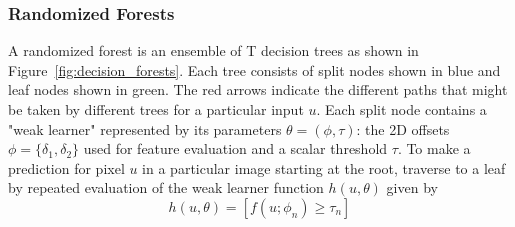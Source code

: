 \subsubsection{Randomized Forests} A randomized forest\cite{Breiman01randomforests} is an ensemble of T decision trees as shown in Figure~\ref{fig:decision_forests}. Each tree consists of split nodes shown in blue and leaf nodes shown in green. The red arrows indicate the different paths that might be taken by different trees for a particular input $u$. Each split node contains a "weak learner" represented by its parameters $\theta = (\phi,\tau)$: the 2D offsets $\phi=\lbrace{ \delta_1,\delta_2 \rbrace}$ used for feature evaluation and a scalar threshold $\tau$. To make a prediction for pixel $u$ in a particular image starting at the root, traverse to a leaf by repeated evaluation of the weak learner function $h(u,\theta)$ given by
\begin{equation}
\label{eqn:weak_learner}
h(u,\theta) = [ f(u;\phi_n) \geq \tau_n ]
\end{equation} 
 
